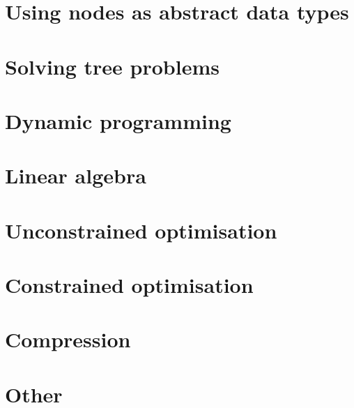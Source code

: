 \documentclass[oneside]{book}
\begin{document}
\part{Using nodes as abstract data types}



\part{Solving tree problems}







\part{Dynamic programming}




\part{Linear algebra}









\part{Unconstrained optimisation}





\part{Constrained optimisation}


\part{Compression}


\part{Other}


\end{document}
